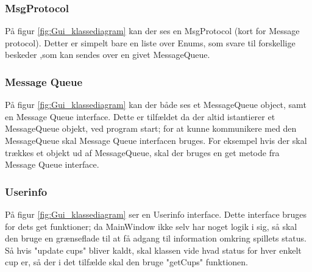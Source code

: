 \documentclass[Softwaredesign/Softwaredesign_main.tex]{subfiles}
\begin{document}
\subsubsection{MsgProtocol}
På figur \ref{fig:Gui_klassediagram} kan der ses en MsgProtocol (kort for Message protocol). Detter er simpelt bare en liste over Enums, som svare til forskellige beskeder ,som kan sendes over en givet MessageQueue. 

\subsubsection{Message Queue}
På figur \ref{fig:Gui_klassediagram} kan der både ses et MessageQueue object, samt en Message Queue interface. Dette er tilfældet da der altid istantierer et MessageQueue objekt, ved program start; for at kunne kommunikere med den MessageQueue skal Message Queue interfacen bruges. For eksempel hvis der skal trækkes et objekt ud af MessageQueue, skal der bruges en get metode fra Message Queue interface. 

\subsubsection{Userinfo}
På figur \ref{fig:Gui_klassediagram} ser en Userinfo interface. Dette interface bruges for dets get funktioner; da MainWindow ikke selv har noget logik i sig, så skal den bruge en grænseflade til at få adgang til information omkring spillets status. Så hvis "update cups" bliver kaldt, skal klassen vide hvad status for hver enkelt cup er, så der i det tilfælde skal den bruge "getCups" funktionen. 
\end{document}
